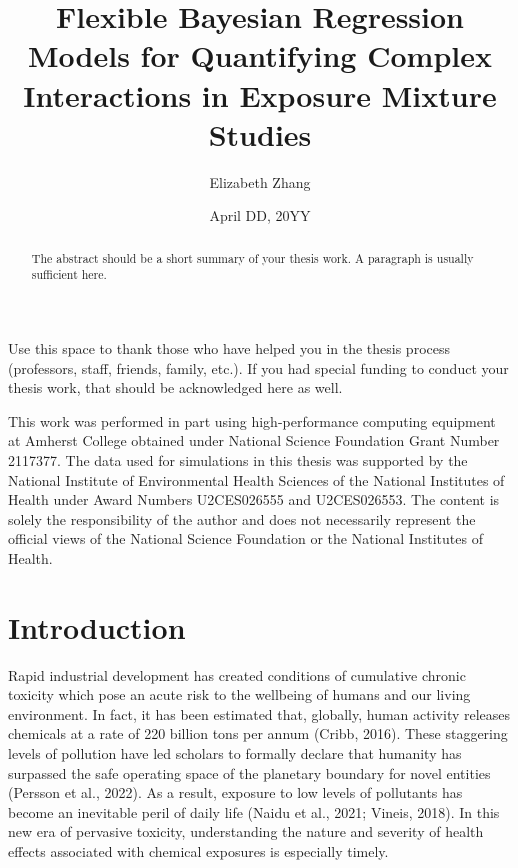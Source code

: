 \documentclass[12pt, twoside]{amherstthesis}
\title{Flexible Bayesian Regression Models for Quantifying Complex Interactions in Exposure Mixture Studies}
\author{Elizabeth Zhang}
\date{April DD, 20YY}
\begin{document}
\doublespace
  \maketitle

\frontmatter %
\pagestyle{fancyplain}

  \begin{abstract}
    The abstract should be a short summary of your thesis work. A paragraph is usually sufficient here.
  \end{abstract}
  \begin{acknowledgments}
    Use this space to thank those who have helped you in the thesis process (professors, staff, friends, family, etc.). If you had special funding to conduct your thesis work, that should be acknowledged here as well.

    This work was performed in part using high-performance computing equipment at Amherst College obtained under National Science Foundation Grant Number 2117377. The data used for simulations in this thesis was supported by the National Institute of Environmental Health Sciences of the National Institutes of Health under Award Numbers U2CES026555 and U2CES026553. The content is solely the responsibility of the author and does not necessarily represent the official views of the National Science Foundation or the National Institutes of Health.
  \end{acknowledgments}

  \hypersetup{linkcolor=black}
  \setcounter{tocdepth}{2}
  \tableofcontents

  \listoftables

  \listoffigures


\mainmatter %
\pagestyle{fancyplain} %

\hypertarget{intro}{%
\chapter{Introduction}\label{intro}}

Rapid industrial development has created conditions of cumulative chronic toxicity which pose an acute risk to the wellbeing of humans and our living environment. In fact, it has been estimated that, globally, human activity releases chemicals at a rate of 220 billion tons per annum (Cribb, 2016). These staggering levels of pollution have led scholars to formally declare that humanity has surpassed the safe operating space of the planetary boundary for novel entities (Persson et al., 2022). As a result, exposure to low levels of pollutants has become an inevitable peril of daily life (Naidu et al., 2021; Vineis, 2018). In this new era of pervasive toxicity, understanding the nature and severity of health effects associated with chemical exposures is especially timely.
\end{document}
